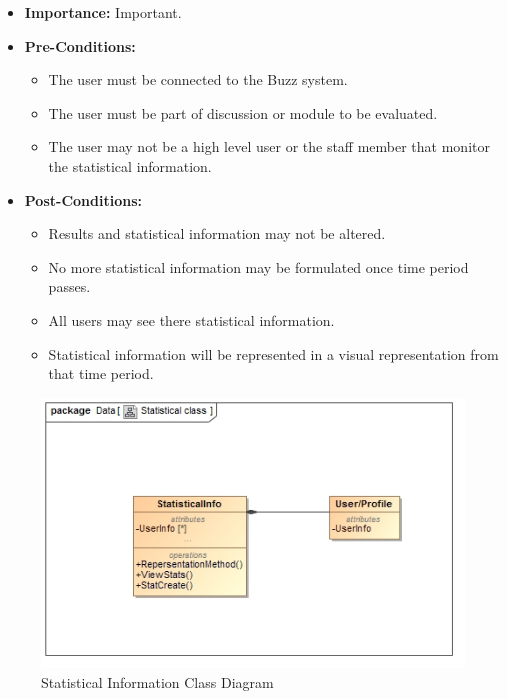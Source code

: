 \documentclass[11pt]{article}
\begin{document}
\begin{enumerate}
\begin{itemize}
 
\item\textbf{Importance:} Important.



\item\textbf{Pre-Conditions: }
	\begin{itemize}
		\item The user must be connected to the Buzz system.
		\item The user must be part of discussion or module to be evaluated.
		\item The user may not be a high level user or the staff member that monitor the statistical information.
	\end{itemize}
 

\item\textbf{Post-Conditions: }
	\begin{itemize}
		\item Results and statistical information may not be altered.
		\item No more statistical information may be formulated once time period passes.
		\item All users may see there statistical information.
		\item Statistical information will be represented in a visual representation from that time period.
	\end{itemize}
\end{itemize}
\graphicspath{ {../Diagrams/Matt/Class/} }
	  \begin{figure}[H]	
    	\includegraphics[scale=0.5]{StatisticalClass.jpg}
    	\caption{Statistical Information Class Diagram}
	\end{figure}


\end{enumerate}
\end{document}
